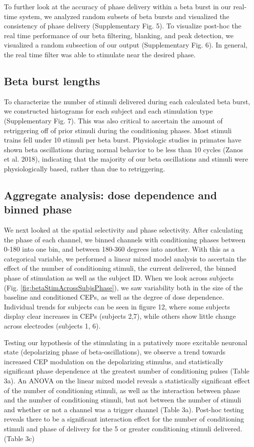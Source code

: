 To further look at the accuracy of phase delivery within a beta burst in our real-time system, we analyzed random subsets of beta bursts and visualized the consistency of phase delivery (Supplementary Fig. 5). To visualize post-hoc the real time performance of our beta filtering, blanking, and peak detection, we visualized a random subsection of our output (Supplementary Fig. 6). In general, the real time filter was able to stimulate near the desired phase. 

\subsection{Beta burst lengths}
To characterize the number of stimuli delivered during each calculated beta burst, we constructed histograms for each subject and each stimulation type (Supplementary Fig. 7). This was also critical to ascertain the amount of retriggering off of prior stimuli during the conditioning phases. Most stimuli trains fell under 10 stimuli per beta burst. Physiologic studies in primates have shown beta oscillations during normal behavior to be less than 10 cycles (Zanos et al. 2018), indicating that the majority of our beta oscillations and stimuli were physiologically based, rather than due to retriggering. 

\subsection{Aggregate analysis: dose dependence and binned phase}
We next looked at the spatial selectivity and phase selectivity. After calculating the phase of each channel, we binned channels with conditioning phases between 0-180 into one bin, and between 180-360 degrees into another. With this as a categorical variable, we performed a linear mixed model analysis to ascertain the effect of the number of conditioning stimuli, the current delivered, the binned phase of stimulation as well as the subject ID. When we look across subjects (Fig. \ref{fig:betaStimAcrossSubjsPhase}), we saw variability both in the size of the baseline and conditioned CEPs, as well as the degree of dose dependence. Individual trends for subjects can be seen in figure 12, where some subjects display clear increases in CEPs (subjects 2,7), while others show little change across electrodes (subjects 1, 6). 

Testing our hypothesis of the stimulating in a putatively more excitable neuronal state (depolarizing phase of beta-oscillations), we observe a trend towards increased CEP modulation on the depolarizing stimulus, and statistically significant phase dependence at the greatest number of conditioning pulses (Table 3a). An ANOVA on the linear mixed model reveals a statistically significant effect of the number of conditioning stimuli, as well as the interaction between phase and the number of conditioning stimuli, but not between the number of stimuli and whether or not a channel was a trigger channel (Table 3a). Post-hoc testing reveals there to be a significant interaction effect for the number of conditioning stimuli and phase of delivery for the 5 or greater conditioning stimuli delivered. (Table 3c)

